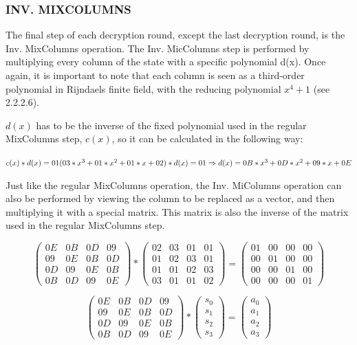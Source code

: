 \documentclass[12pt]{report}
\theoremstyle{definition}
\theoremstyle{remark}
\begin{document}
\subsubsection{INV. MIXCOLUMNS}
The final step of each decryption round, except the last decryption round, is the Inv. MixColumns operation. The Inv. MicColumns step is performed by multiplying every column of the state with a specific polynomial d(x)\cite{Rijndael}. Once again, it is important to note that each column is seen as a third-order polynomial in Rijndaels finite field, with the reducing polynomial $x^4+1$ (see 2.2.2.6).

$d(x)$ has to be the inverse of the fixed polynomial used in the regular MixColumns step, $c(x)$, so it can be calculated in the following way:

\noindent
$c(x)*d(x)=01 \\
(03*x^3+01*x^2+01*x+02)*d(x)=01 \\
\Rightarrow d(x)=0B*x^3+0D*x^2+09*x+0E$

Just like the regular MixColumns operation, the Inv. MiColumns operation can also be performed by viewing the column to be replaced as a vector, and then multiplying it with a special matrix. This matrix is also the inverse of the matrix used in the regular MixColumns step.

\[ \left( \begin{array}{cccc}
0E & 0B & 0D & 09 \\
09 & 0E & 0B & 0D \\
0D & 09 & 0E & 0B \\
0B & 0D & 09 & 0E\end{array} \right)
*
\left( \begin{array}{cccc}
02 & 03 & 01 & 01 \\
01 & 02 & 03 & 01 \\
01 & 01 & 02 & 03 \\
03 & 01 & 01 & 02\end{array} \right)
=
\left( \begin{array}{cccc}
01 & 00 & 00 & 00 \\
00 & 01 & 00 & 00 \\
00 & 00 & 01 & 00 \\
00 & 00 & 00 & 01\end{array} \right)
\]

\[ \left( \begin{array}{cccc}
0E & 0B & 0D & 09 \\
09 & 0E & 0B & 0D \\
0D & 09 & 0E & 0B \\
0B & 0D & 09 & 0E\end{array} \right)
*
\left( \begin{array}{c}
s_0 \\
s_1 \\
s_2 \\
s_3\end{array} \right)
=
\left( \begin{array}{c}
a_0 \\
a_1 \\
a_2 \\
a_3\end{array} \right)
\]
\end{document}
